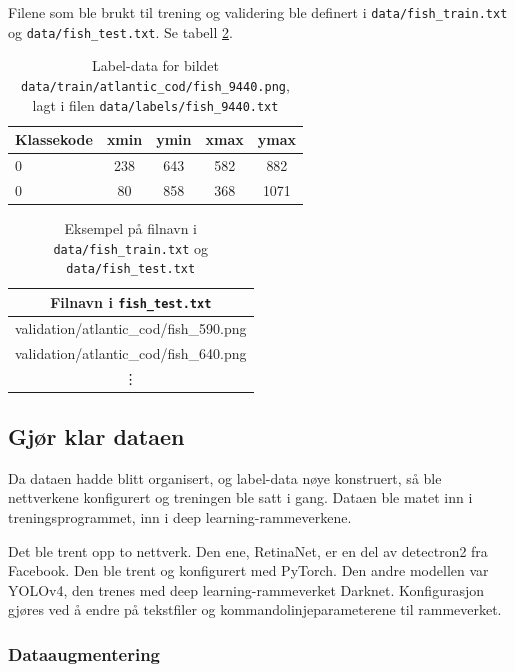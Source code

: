 Filene som ble brukt til trening og validering ble definert i \texttt{data/fish\_train.txt} og \texttt{data/fish\_test.txt}. Se tabell \ref{tab:fish}.

\begin{table}[b]
\bigskip
\centering
\caption{Label-data for bildet \texttt{data/train/atlantic\_cod/fish\_9440.png}, lagt i filen \texttt{data/labels/fish\_9440.txt}}
\label{tab:bbox} 
\begin{tabular}[t]{lcccc}
\toprule
Klassekode    & xmin      & ymin    & xmax     & ymax \\
\midrule
0 & 238 & 643 & 582 & 882 \\
0 & 80   & 858 & 368 & 1071 \\
\bottomrule	
\end{tabular}
\end{table}

\begin{table}[b]
\bigskip
\centering
\caption{Eksempel på filnavn i \texttt{data/fish\_train.txt} og \texttt{data/fish\_test.txt}}
\label{tab:fish} 
\begin{tabular}[t]{c}
\toprule
Filnavn i \texttt{fish\_test.txt} \\
\midrule
validation/atlantic\_cod/fish\_590.png \\
validation/atlantic\_cod/fish\_640.png \\
\vdots \\
\bottomrule	
\end{tabular}
\end{table}

\subsection{Gjør klar dataen}

Da dataen hadde blitt organisert, og label-data nøye konstruert, så ble nettverkene konfigurert og treningen ble satt i gang. Dataen ble matet inn i treningsprogrammet, inn i deep learning-rammeverkene.

Det ble trent opp to nettverk. Den ene, RetinaNet, er en del av detectron2 fra Facebook. Den ble trent og konfigurert med PyTorch. Den andre modellen var YOLOv4, den trenes med deep learning-rammeverket Darknet. Konfigurasjon gjøres ved å endre på tekstfiler og kommandolinjeparameterene til rammeverket.

\subsubsection{Dataaugmentering}

